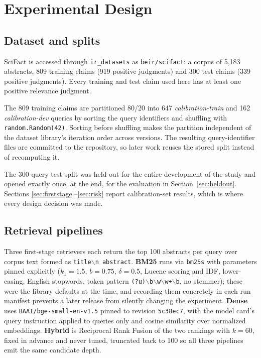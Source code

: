 \documentclass[11pt,a4paper]{article}
\begin{document}
\section{Experimental Design}

\subsection{Dataset and splits}
\label{sec:data}

SciFact is accessed through \texttt{ir\_datasets} as \texttt{beir/scifact}: a corpus of 5{,}183
abstracts, 809 training claims (919 positive judgments) and 300 test claims (339 positive
judgments). Every training and test claim used here has at least one positive relevance
judgment.

The 809 training claims are partitioned 80/20 into 647 \emph{calibration-train} and 162
\emph{calibration-dev} queries by sorting the query identifiers and shuffling with
\texttt{random.Random(42)}. Sorting before shuffling makes the partition independent of the
dataset library's iteration order across versions. The resulting query-identifier files are
committed to the repository, so later work reuses the stored split instead of recomputing it.

The 300-query test split was held out for the entire development of the study and opened
exactly once, at the end, for the evaluation in Section~\ref{sec:heldout}. Sections
\ref{sec:firststage}--\ref{sec:risk} report calibration-set results, which is where every
design decision was made.

\subsection{Retrieval pipelines}
\label{sec:pipelines}

Three first-stage retrievers each return the top 100 abstracts per query over corpus text formed
as \texttt{title$\backslash$n abstract}. \textbf{BM25} runs via \texttt{bm25s}
\citep{lu2024bm25s} with parameters pinned explicitly ($k_1 = 1.5$, $b = 0.75$, $\delta = 0.5$,
Lucene scoring and IDF, lower-casing, English stopwords, token pattern
\texttt{(?u)$\backslash$b$\backslash$w$\backslash$w+$\backslash$b}, no stemmer); these were the
library defaults at the time, and recording them concretely in each run manifest prevents a later
release from silently changing the experiment. \textbf{Dense} uses
\texttt{BAAI/bge-small-en-v1.5} \citep{xiao2024cpack} pinned to revision \texttt{5c38ec7}, with
the model card's query instruction applied to queries only and cosine similarity over normalized
embeddings. \textbf{Hybrid} is Reciprocal Rank Fusion \citep{cormack2009rrf} of the two rankings
with $k = 60$, fixed in advance and never tuned, truncated back to 100 so all three pipelines
emit the same candidate depth.
\end{document}
